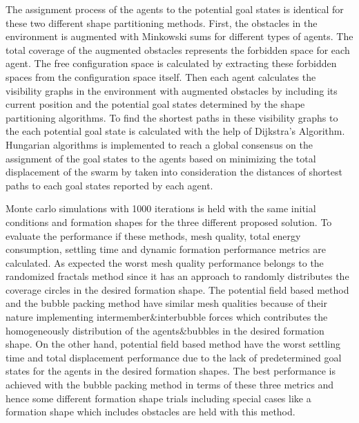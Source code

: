 The assignment process of the agents to the potential goal states is identical for these two different shape partitioning methods. First, the obstacles in the environment is augmented with Minkowski sums for different types of agents. The total coverage of the augmented obstacles represents the forbidden space for each agent. The free configuration space is calculated by extracting these forbidden spaces from the configuration space itself. Then each agent calculates the visibility graphs in the environment with augmented obstacles by including its current position and the potential goal states determined by the shape partitioning algorithms. To find the shortest paths in these visibility graphs to the each potential goal state is calculated with the help of Dijkstra's Algorithm. Hungarian algorithms is implemented to reach a global consensus on the assignment of the goal states to the agents based on minimizing the total displacement of the swarm by taken into consideration the distances of shortest paths to each goal states reported by each agent. 
       
Monte carlo simulations with 1000 iterations is held with the same initial conditions and formation shapes for the three different proposed solution. To evaluate the performance if these methods, mesh quality, total energy consumption, settling time and dynamic formation performance metrics are calculated. As expected the worst mesh quality performance belongs to the randomized fractals method since it has an approach to randomly distributes the coverage circles in the desired formation shape. The potential field based method and the bubble packing method have similar mesh qualities because of their nature implementing intermember$\&$interbubble forces which contributes the homogeneously distribution of the agents$\&$bubbles in the desired formation shape. On the other hand, potential field based method have the worst settling time and total displacement performance due to the lack of predetermined goal states for the agents in the desired formation shapes. The best performance is achieved with the bubble packing method in terms of these three metrics and hence some different formation shape trials including special cases like a formation shape which includes obstacles are held with this method. 
       
